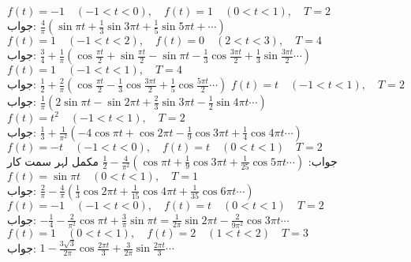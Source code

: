 \quad
$f(t)=-1\quad (-1<t<0), \quad f(t)=1\quad (0<t<1),\quad T=2$\\
جواب:\quad
$\tfrac{4}{\pi}(\sin \pi t+\tfrac{1}{3}\sin 3\pi t+\tfrac{1}{5}\sin 5\pi t+\cdots)$
\quad
$f(t)=1\quad (-1<t<2), \quad f(t)=0\quad (2<t<3),\quad T=4$\\
جواب:\quad
$\tfrac{3}{4}+\tfrac{1}{\pi}(\cos \tfrac{\pi t}{2}+\sin \tfrac{\pi t}{2}-\sin \pi t-\tfrac{1}{3}\cos \tfrac{3\pi t}{2}+\tfrac{1}{3}\sin \tfrac{3\pi t}{2}\cdots)$
\quad
$f(t)=1\quad (-1<t<1),\quad T=4$\\
جواب:\quad
$\tfrac{1}{2}+\tfrac{2}{\pi}(\cos \tfrac{\pi t}{2}-\tfrac{1}{3}\cos \tfrac{3\pi t}{2}+\tfrac{1}{5}\cos \tfrac{5\pi t}{2}\cdots)$
\quad
$f(t)=t\quad (-1<t<1),\quad T=2$\\
جواب:\quad
$\tfrac{1}{\pi}(2\sin \pi t-\sin 2\pi t+\tfrac{2}{3}\sin 3\pi t-\tfrac{1}{2}\sin 4\pi t\cdots)$
\quad
$f(t)=t^2\quad (-1<t<1),\quad T=2$\\
جواب:\quad
$\tfrac{1}{3}+\tfrac{1}{\pi^2}(-4\cos \pi t+\cos 2\pi t-\tfrac{1}{9}\cos 3\pi t+\tfrac{1}{4}\cos 4\pi t\cdots)$
\quad
$f(t)=-t\quad (-1<t<0),\quad f(t)=t\quad (0<t<1)\quad T=2$\\
جواب:\quad
$\tfrac{1}{2}-\tfrac{4}{\pi^2}(\cos \pi t+\tfrac{1}{9}\cos 3\pi t+\tfrac{1}{25}\cos 5\pi t\cdots)$
\quad مکمل لہر سمت کار\quad 
$f(t)=\sin \pi t\quad (0<t<1),\quad T=1$\\
جواب:\quad
$\tfrac{2}{\pi}-\tfrac{4}{\pi}(\tfrac{1}{3}\cos 2\pi t+\tfrac{1}{15}\cos 4\pi t+\tfrac{1}{35}\cos 6\pi t\cdots)$
\quad
$f(t)=-1\quad (-1<t<0),\quad f(t)=t\quad (0<t<1)\quad T=2$\\
جواب:\quad
$-\tfrac{1}{4}-\tfrac{2}{\pi^2}\cos \pi t+\tfrac{3}{\pi}\sin \pi t=\tfrac{1}{2\pi}\sin 2\pi t-\tfrac{2}{9\pi^2}\cos 3\pi t\cdots$
\quad
$f(t)=1\quad (0<t<1),\quad f(t)=2\quad (1<t<2)\quad T=3$\\
جواب:\quad
$1-\tfrac{3\sqrt{3}}{2\pi}\cos \tfrac{2\pi t}{3}+\tfrac{3}{2\pi}\sin \tfrac{2\pi t}{3}\cdots$
